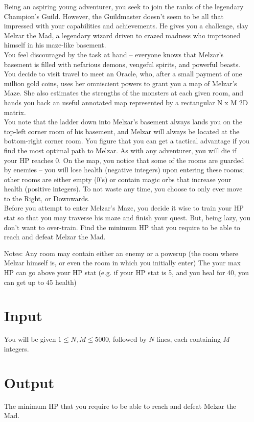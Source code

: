 
Being an aspiring young adventurer, you seek to join the ranks of the legendary Champion’s Guild. However, the Guildmaster doesn’t seem to be
all that impressed with your capabilities and achievements. He gives you a challenge, slay Melzar the Mad, a legendary wizard driven to crazed
madness who imprisoned himself in his maze-like basement. \\

You feel discouraged by the task at hand – everyone knows that Melzar’s basement is filled with nefarious demons, vengeful 
spirits, and powerful beasts. You decide to visit travel to meet an Oracle, who, after a small payment of one million gold coins, uses
her omniscient powers to grant you a map of Melzar’s Maze. She also estimates the strengths of the monsters at each
given room, and hands you back an useful annotated map represented by a rectangular N x M 2D matrix. \\

You note that the ladder down into Melzar's basement always lands you on the top-left corner room of his basement, and
Melzar will always be located at the bottom-right corner room. You figure that you can get a tactical advantage if you find the most optimal
path to Melzar. As with any adventurer, you will die if your HP reaches 0. On the map, you notice that some of the rooms are guarded by enemies –
you will lose health (negative integers) upon entering these rooms; other rooms are either empty (0's) or contain magic
orbs that increase your health (positive integers). To not waste any time, you choose to only ever move to the Right, or Downwards. \\

Before you attempt to enter Melzar’s Maze, you decide it wise to train your HP stat so that you may traverse his maze and finish your quest.
But, being lazy, you don’t want to over-train. Find the minimum HP that you require to be able to reach and defeat
Melzar the Mad.

Notes:
Any room may contain either an enemy or a powerup (the room where Melzar himself is, or even the room in which you initially enter)
The your max HP can go above your HP stat (e.g. if your HP stat is 5, and you heal for 40, you can get up to 45 health)


\section*{Input}
You will be given $1 \leq N,M \leq 5000$, followed by $N$ lines, each containing $M$  integers.
\section*{Output}
The minimum HP that you require to be able to reach and defeat Melzar the Mad.
